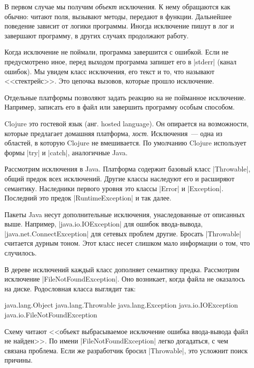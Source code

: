 В первом случае мы получим \emph{объект} исключения. К нему обращаются как
обычно: читают поля, вызывают методы, передают в функции. Дальнейшее поведение
зависит от логики программы. Иногда исключение пишут в лог и завершают
программу, в других случаях продолжают работу.

Когда исключение не поймали, программа завершится с ошибкой. Если не
предусмотрено иное, перед выходом программа запишет его в \spverb|stderr| (канал
ошибок). Мы увидем класс исключения, его текст и то, что называют
<<стектрейс>>. Это цепочка вызовов, которые прошло исключение.

Отдельные платформы позволяют задать реакцию на не пойманное
исключение. Например, записать его в файл или завершить программу особым
способом.

Clojure это гостевой язык (анг. hosted language). Он опирается на возможности,
которые предлагает домашняя платформа, \emph{хост}.  Исключения~--- одна из
областей, в которую Clojure не вмешивается. По умолчанию Clojure использует
формы \spverb|try| и \spverb|catch|, аналогичные Java.

Рассмотрим исключения в Java. Платформа содержит базовый класс
\spverb|Throwable|, общий предок всех исключений. Другие классы наследуют его и
расширяют семантику. Наследники первого уровня это классы \spverb|Error| и
\spverb|Exception|. Последний это предок \spverb|RuntimeException| и так далее.


Пакеты Java несут дополнительные исключения, унаследованные от описанных
выше. Например, \spverb|java.io.IOException| для ошибок ввода-вывода,
\spverb|java.net.ConnectException| для сетевых проблем другие. Бросать
\spverb|Throwable| считается дурным тоном. Этот класс несет слишком мало
информации о том, что случилось.

В дереве исключений каждый класс дополняет семантику предка. Рассмотрим
исключение \spverb|FileNotFoundException|. Оно возникает, когда файла не
оказалось на диске. Родословная класса выглядит так:

\begin{english}
  \begin{text}
java.lang.Object
  java.lang.Throwable
    java.lang.Exception
      java.io.IOException
        java.io.FileNotFoundException
  \end{text}
\end{english}

Схему читают <<объект \arr выбрасываемое \arr исключение \arr ошибка
ввода-вывода \arr файл не найден>>. По имени \spverb|FileNotFoundException|
легко догадаться, с чем связана проблема. Если же разработчик бросил
\spverb|Throwable|, это усложнит поиск причины.

